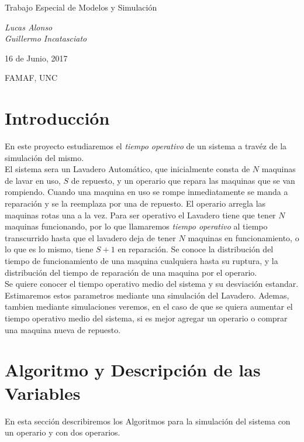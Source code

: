\documentclass[12pt]{article}
\begin{document}
\begin{titlepage}
\begin{center}
\vspace*{1.in}
\begin{Large}


{\huge  Trabajo Especial de Modelos y Simulación }


\vspace{2.5in}
{\it Lucas Alonso}\\
{\it Guillermo Incatasciato}

\vspace*{3in}


16 de Junio, 2017
\vspace*{0.5in}

FAMAF, UNC

\end{Large}
\end{center}
\end{titlepage}

\section{Introducción}
En este proyecto estudiaremos el {\it tiempo operativo} de un sistema a travéz de la simulación del mismo.\\
El sistema sera un Lavadero Automático, que inicialmente consta de $N$ maquinas de lavar en uso, $S$ de repuesto, y un operario que repara las maquinas que se van rompiendo. Cuando una maquina en uso se rompe inmediatamente se manda a reparación y se la reemplaza por una de repuesto. El operario arregla las maquinas rotas una a la vez.
Para ser operativo el Lavadero tiene que tener $N$ maquinas funcionando, por lo que llamaremos {\it tiempo operativo} al tiempo transcurrido hasta que el lavadero deja de tener $N$ maquinas en funcionamiento, o lo que es lo mismo,  tiene $S+1$ en reparación. Se conoce la distribución del  tiempo de funcionamiento de una maquina cualquiera hasta su ruptura, y la distribución del tiempo de reparación de una maquina por el operario.\\
Se quiere conocer el 	tiempo operativo medio del sistema y su desviación estandar.\\
Estimaremos estos parametros mediante una simulación del Lavadero. Ademas, tambien mediante simulaciones veremos, en el caso de que se quiera aumentar el tiempo operativo medio del sistema, si es mejor agregar un operario o comprar una maquina nueva de repuesto.


\section{Algoritmo y Descripción de las Variables}
En esta sección describiremos los Algoritmos para la simulación del sistema con un operario y con dos operarios.
\end{document}
